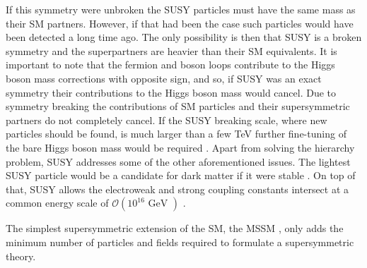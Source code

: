 If this symmetry were unbroken the \ac{SUSY} particles must
have the same mass as their \ac{SM} partners. However, if that had 
been the case such particles would have been detected a long time ago. The 
only possibility is then that \ac{SUSY} is a broken symmetry and the superpartners
are heavier than their \ac{SM} equivalents. It is important to note
that the fermion and boson loops contribute to the Higgs boson
mass corrections with opposite sign, and so, if \ac{SUSY}
was an exact symmetry their contributions to the Higgs boson mass
would cancel. Due to 
symmetry breaking the contributions of \ac{SM} particles 
and their supersymmetric partners do not completely cancel. If
the \ac{SUSY} breaking scale, where new particles should
be found, is much larger than a few TeV further fine-tuning of 
the bare Higgs boson mass would be required \cite{MSSM-carena-haber,SUSY-primer}.
Apart from solving the hierarchy problem, \ac{SUSY} addresses some
of the other aforementioned issues. The lightest \ac{SUSY} particle
would be a candidate for dark matter if it were stable \cite{SUSY-primer}. On top of that,
\ac{SUSY} allows the electroweak and strong coupling
constants intersect at a common energy scale of $\mathcal{O}(10^{16} \text{ GeV })$ \cite{GUT-LEP}. 

The simplest supersymmetric extension of the \ac{SM}, the \ac{MSSM} \cite{SUSY-primer}, only adds the minimum
number of particles and fields required to formulate a supersymmetric theory.


